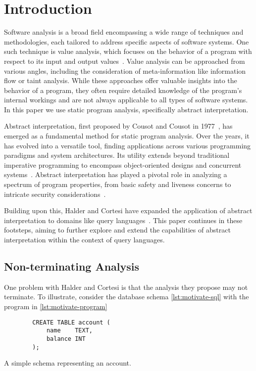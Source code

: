 \section{Introduction}\label{sec:introduction}
Software analysis is a broad field encompassing a wide range of techniques and methodologies, each tailored to address specific aspects of software systems.
One such technique is value analysis, which focuses on the behavior of a program with respect to its input and output values~\cite{jackson_software_2000}.
Value analysis can be approached from various angles, including the consideration of meta-information like information flow or taint analysis.
While these approaches offer valuable insights into the behavior of a program, they often require detailed knowledge of the program's internal workings and are not always applicable to all types of software systems.
In this paper we use static program analysis, specifically abstract interpretation.

Abstract interpretation, first proposed by Cousot and Cousot in 1977~\cite{cousot_abstract_1977}, has emerged as a fundamental method for static program analysis.
Over the years, it has evolved into a versatile tool, finding applications across various programming paradigms and system architectures.
Its utility extends beyond traditional imperative programming to encompass object-oriented designs and concurrent systems~\cite{gustafsson_analyzing_2013, mine_static_2023}.
Abstract interpretation has played a pivotal role in analyzing a spectrum of program properties, from basic safety and liveness concerns to intricate security considerations~\cite{mastroeni_abstract_2011}.

Building upon this, Halder and Cortesi have expanded the application of abstract interpretation to domains like query languages~\cite{halder_abstract_2012}.
This paper continues in these footsteps, aiming to further explore and extend the capabilities of abstract interpretation within the context of query languages.


\subsection{Non-terminating Analysis}\label{subsec:non-terminating-analysis}
One problem with Halder and Cortesi is that the analysis they propose may not terminate.
To illustrate, consider the database schema \autoref{lst:motivate-sql} with the program in \autoref{lst:motivate-program}


\begin{listing}
    \begin{verbatim}
        CREATE TABLE account (
            name    TEXT,
            balance INT
        );
    \end{verbatim}
    \caption{A simple schema representing an account.}
    \label{lst:motivate-sql}
\end{listing}


